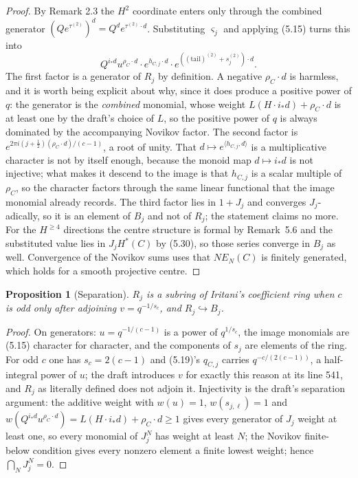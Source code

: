 \documentclass[11pt]{article}
\newtheorem{proposition}[theorem]{Proposition}
\theoremstyle{definition}
\theoremstyle{remark}
\begin{document}
\begin{proof}
By Remark 2.3 the $H^2$ coordinate enters only through the combined generator
$(Qe^{\tau^{(2)}})^d=Q^de^{\tau^{(2)}\cdot d}$. Substituting $\varsigma_j$ and
applying (5.15) turns this into
\[
  Q^{i_*d}u^{\rho_C\cdot d}\cdot e^{h_{C,j}\cdot d}
  \cdot e^{((\text{tail})^{(2)}+s_j^{(2)})\cdot d}.
\]
The first factor is a generator of $R_j$ by definition. A negative $\rho_C\cdot d$
is harmless, and it is worth being explicit about why, since it does produce a
positive power of $q$: the generator is the \emph{combined} monomial, whose weight
$L(H\cdot i_*d)+\rho_C\cdot d$ is at least one by the draft's choice of $L$, so the
positive power of $q$ is always dominated by the accompanying Novikov factor. The
second factor is $e^{2\pi i(j+\frac12)(\rho_C\cdot d)/(c-1)}$, a root of unity.
That $d\mapsto e^{\langle h_{C,j},d\rangle}$ is a multiplicative character is not
by itself enough, because the monoid map $d\mapsto i_*d$ is not injective; what
makes it descend to the image is that $h_{C,j}$ is a scalar multiple of $\rho_C$,
so the character factors through the same linear functional that the image
monomial already records. The third factor lies in $1+J_j$ and converges
$J_j$-adically, so it is an element of $B_j$ and not of $R_j$; the statement claims
no more. For the $H^{\ge4}$ directions the centre structure is formal by
Remark~5.6 and the substituted value lies in $J_jH^*(C)$ by (5.30), so those series
converge in $B_j$ as well. Convergence of the Novikov sums uses that $NE_N(C)$ is
finitely generated, which holds for a smooth projective centre.
\end{proof}

\begin{proposition}[Separation]
\label{prop:separation}
$R_j$ is a subring of Iritani's coefficient ring when $c$ is odd only after
adjoining $v=q^{-1/s_c}$, and $R_j\hookrightarrow B_j$.
\end{proposition}

\begin{proof}
On generators: $u=q^{-1/(c-1)}$ is a power of $q^{1/s_c}$, the image monomials are
(5.15) character for character, and the components of $s_j$ are elements of the
ring. For odd $c$ one has $s_c=2(c-1)$ and (5.19)'s $q_{C,j}$ carries
$q^{-c/(2(c-1))}$, a half-integral power of $u$; the draft introduces $v$ for
exactly this reason at its line 541, and $R_j$ as literally defined does not
adjoin it. Injectivity is the draft's separation argument: the additive weight with
$w(u)=1$, $w(s_{j,\ell})=1$ and
$w(Q^{i_*d}u^{\rho_C\cdot d})=L(H\cdot i_*d)+\rho_C\cdot d\ge1$ gives every
generator of $J_j$ weight at least one, so every monomial of $J_j^N$ has weight at
least $N$; the Novikov finite-below condition gives every nonzero element a finite
lowest weight; hence $\bigcap_NJ_j^N=0$.
\end{proof}
\end{document}
